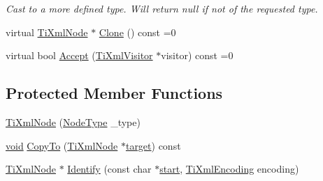 \begin{DoxyCompactItemize}
\begin{DoxyCompactList}\small\item\em Cast to a more defined type. Will return null if not of the requested type. \end{DoxyCompactList}\item 
virtual \hyperlink{class_ti_xml_node}{Ti\-Xml\-Node} $\ast$ \hyperlink{class_ti_xml_node_a4508cc3a2d7a98e96a54cc09c37a78a4}{Clone} () const =0
\item 
virtual bool \hyperlink{class_ti_xml_node_acc0f88b7462c6cb73809d410a4f5bb86}{Accept} (\hyperlink{class_ti_xml_visitor}{Ti\-Xml\-Visitor} $\ast$visitor) const =0
\end{DoxyCompactItemize}
\subsection*{Protected Member Functions}
\begin{DoxyCompactItemize}
\item 
\hyperlink{class_ti_xml_node_a3f46721695868667113c7487ff123f20}{Ti\-Xml\-Node} (\hyperlink{class_ti_xml_node_a836eded4920ab9e9ef28496f48cd95a2}{Node\-Type} \-\_\-type)
\item 
\hyperlink{wglew_8h_aeea6e3dfae3acf232096f57d2d57f084}{void} \hyperlink{class_ti_xml_node_ab6056978923ad8350fb5164af32d8038}{Copy\-To} (\hyperlink{class_ti_xml_node}{Ti\-Xml\-Node} $\ast$\hyperlink{glew_8h_aa43eab0fe80422366a4602998d53b133}{target}) const 
\item 
\hyperlink{class_ti_xml_node}{Ti\-Xml\-Node} $\ast$ \hyperlink{class_ti_xml_node_a0c9ec7050419887bf84dcad64f7537bd}{Identify} (const char $\ast$\hyperlink{glew_8h_ac55adc720a3098c1b454d2a4647f4361}{start}, \hyperlink{tinyxml_8h_a88d51847a13ee0f4b4d320d03d2c4d96}{Ti\-Xml\-Encoding} encoding)
\end{DoxyCompactItemize}
